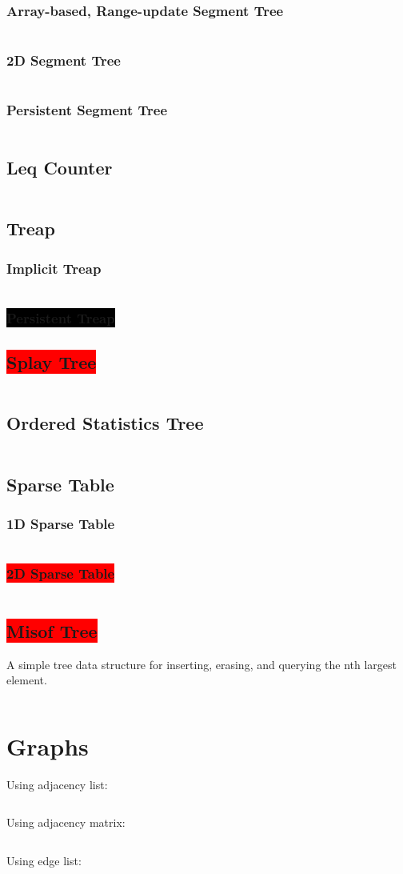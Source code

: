 \documentclass[8pt,a4paper,landscape,oneside]{amsart}
\newcommand{\code}[1]{\inputminted[fontsize=\normalsize,baselinestretch=1]{cpp}{_code/#1}}
\newcommand{\subsectionRed}[1]{\subsection{\colorbox{red}{\color{white}#1}}}
\newcommand{\subsubsectionRed}[1]{\subsubsection{\colorbox{red}{\color{white}#1}}}
\newcommand{\subsubsectionBlack}[1]{\subsubsection{\colorbox{black}{\color{white}#1}}}
\begin{document}
\begin{multicols*}{3}
    \subsubsection{Array-based, Range-update Segment Tree}
      \code{data-structures/segtree_array_lazy.cpp}
    \subsubsection{2D Segment Tree}
      \code{data-structures/segtree_2d.cpp}
    \subsubsection{Persistent Segment Tree}
      \code{data-structures/segtree_persistent_rec.cpp}
  \subsection{Leq Counter}
    \code{data-structures/leq_counter.cpp}
  \subsection{Treap}
		\subsubsection{Implicit Treap}
			\code{data-structures/treap_implicit.cpp}
		\subsubsectionBlack{Persistent Treap}
  \subsectionRed{Splay Tree}
    \code{data-structures/splay.cpp}
	\subsection{Ordered Statistics Tree}
    \code{data-structures/ordered_statistics_tree.cpp}
  \subsection{Sparse Table}
    \subsubsection{1D Sparse Table}
      \code{data-structures/sparse.cpp}
    \subsubsectionRed{2D Sparse Table}
      \code{data-structures/sparse_2d.cpp}
  \subsectionRed{Misof Tree}
    A simple tree data structure for inserting, erasing, and querying the nth largest element.
    \code{data-structures/misof_tree.cpp}
\section{Graphs}
	Using adjacency list:
	\code{graphs/graph_template_adjlist.cpp}
	Using adjacency matrix:
	\code{graphs/graph_template_adjmat.cpp}
	Using edge list:
	\code{graphs/graph_template_edgelist.cpp}

\end{multicols*}
\end{document}
